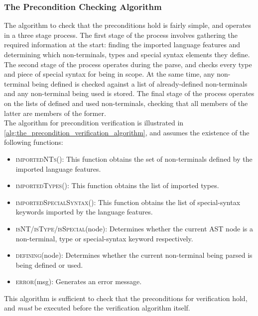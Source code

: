 \subsubsection{The Precondition Checking Algorithm} %
\label{ssub:the_precondition_checking_algorithm}
The algorithm to check that the preconditions hold is fairly simple, and operates in a three stage process.
The first stage of the process involves gathering the required information at the start: finding the imported language features and determining which non-terminals, types and special syntax elements they define.
The second stage of the process operates during the parse, and checks every type and piece of special syntax for being in scope. 
At the same time, any non-terminal being defined is checked against a list of already-defined non-terminals and any non-terminal being used is stored.
The final stage of the process operates on the lists of defined and used non-terminals, checking that all members of the latter are members of the former.\\

The algorithm for precondition verification is illustrated in \autoref{alg:the_precondition_verification_algorithm}, and assumes the existence of the following functions:
\begin{itemize}
    \item \textsc{importedNTs}(): This function obtains the set of non-terminals defined by the imported language features.
    \item \textsc{importedTypes}(): This function obtains the list of imported types.
    \item \textsc{importedSpecialSyntax}(): This function obtains the list of special-syntax keywords imported by the language features. 
    \item \textsc{isNT/isType/isSpecial}(node): Determines whether the current AST node is a non-terminal, type or special-syntax keyword respectively.
    \item \textsc{defining}(node): Determines whether the current non-terminal being parsed is being defined or used. 
    \item \textsc{error}(msg): Generates an error message.
\end{itemize}

This algorithm is sufficient to check that the preconditions for verification hold, and \textit{must} be executed before the verification algorithm itself.

